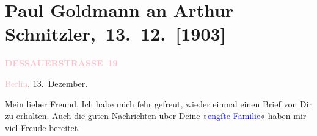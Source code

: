 

\renewcommand{\erwaehntePersonen}{Personen:  ?? [Berliner Musikkorrespondent der National-Zeitung], Hermann Bahr, Ludwig Bauer, Richard Beer-Hofmann, Emilie Dorothea Popper, Theodore Rottenberg, Olga Schnitzler, Heinrich Schnitzler, Louise Schnitzler, Karl Eduard Vehse}
\renewcommand{\erwaehnteInstitutionen}{Institutionen: National-Zeitung, Reichstag, Verein zur Förderung der Künste}
\renewcommand{\erwaehnteOrte}{Orte: Berlin, Dessauer Straße, Frankfurt am Main, Semmering, Wien, Ägypten}
\renewcommand{\erwaehnteWerke}{Werke: Briefe, die ihn nicht erreichten, Der einsame Weg. Schauspiel in fünf Akten, Die Gouvernante, Neue Freie Presse, Theater- und Kunstnachrichten. [Konzerte.]. [Man schreibt uns aus Berlin], [Aus Berlin wird uns gemeldet: »Der einsame Weg«]}
\section[ Paul Goldmann an Arthur Schnitzler, 13. 12. {[}1903{]}]{Paul Goldmann an Arthur Schnitzler, 13. 12. {[}1903{]}}
\nopagebreak{}
\rehead{ }\normalsize\beginnumbering{}
\toendnotes[C]{\smallbreak\pagebreak[2]}
\toendnotes[C]{\smallbreak}
\pstart
           \noindent{}\raggedleft{}{\pb}\textcolor{gray}{\textbf{\textcolor{pink}{DESSAUERSTRASSE 19}{}\ledrightnote{\textcolor{pink}{Dessauer Straße}}}}\pend
           
\pstart
           \textcolor{pink}{Berlin}{}\ledrightnote{\textcolor{pink}{Berlin}}, 13. Dezember.\pend
           
\pstart\center{}Mein lieber Freund,\pend
\pstart
           Ich habe mich ſehr gefreut, wieder einmal einen Brief von Dir zu erhalten. Auch die
               guten Nachrichten über Deine »\textcolor{blue}{engſte Familie}{}\ledrightnote{{$\rightarrow$}\textcolor{blue}{Olga Schnitzler}{\newline}{$\rightarrow$}\textcolor{blue}{Heinrich Schnitzler}}« haben mir viel Freude bereitet.\pend
           
